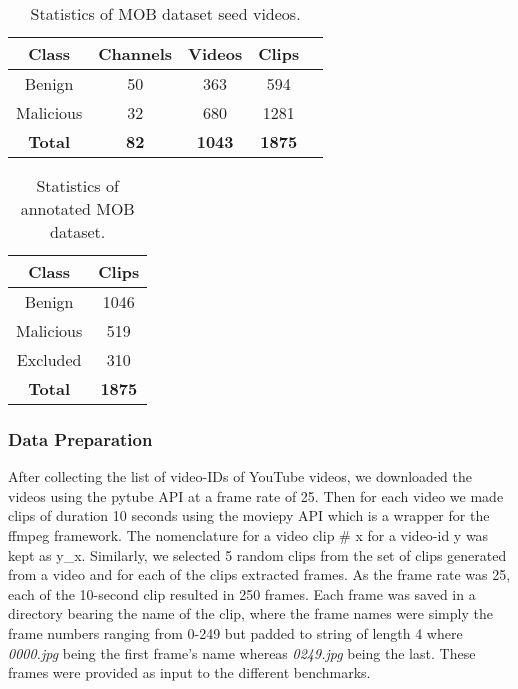 \documentclass[letterpaper]{article}
\begin{document}
\begin{table}[h!]
\centering
\begin{tabular}{|c|c|c|c|c|} 
 \hline
 \rowcolor{Gray}
 \textbf{Class} & \textbf{Channels} & \textbf{Videos} & \textbf{Clips} \\ [0.5ex] 
 \hline
 Benign & 50 & 363 & 594\\ 
 \hline
 Malicious & 32 & 680 & 1281\\
 \hline
\textbf{Total} & \textbf{82} & \textbf{1043} & \textbf{1875} \\
 \hline
\end{tabular}
\caption{Statistics of MOB dataset seed videos.}
\label{tab:stats1}
\end{table}

\begin{table}[h!]
\centering
\begin{tabular}{|c|c|} 
 \hline
 \rowcolor{Gray}
 \textbf{Class} & \textbf{Clips} \\ [0.5ex] 
 \hline
 Benign & 1046\\ 
 \hline
 Malicious & 519\\
 \hline
 Excluded & 310\\ \hline
\textbf{Total} & \textbf{1875} \\
 \hline
\end{tabular}
\caption{Statistics of annotated MOB dataset.}
\label{tab:stats2}
\end{table}

\subsubsection{Data Preparation}
After collecting the list of video-IDs of YouTube videos, we downloaded the videos using the pytube API at a frame rate of 25. Then for each video we made clips of duration 10 seconds using the moviepy API which is a wrapper for the ffmpeg framework. The nomenclature for a video clip \# x for a video-id y was kept as y\_x. Similarly, we selected 5 random clips from the set of clips generated from a video and for each of the clips extracted frames. As the frame rate was 25, each of the 10-second clip resulted in 250 frames. Each frame was saved in a directory bearing the name of the clip, where the frame names were simply the frame numbers ranging from 0-249 but padded to string of length 4 where \textit{0000.jpg} being the first frame's name whereas \textit{0249.jpg} being the last. These frames were provided as input to the different benchmarks.
\end{document}
